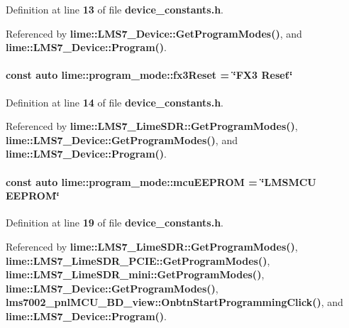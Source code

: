 Definition at line {\bf 13} of file {\bf device\+\_\+constants.\+h}.



Referenced by {\bf lime\+::\+L\+M\+S7\+\_\+\+Device\+::\+Get\+Program\+Modes()}, and {\bf lime\+::\+L\+M\+S7\+\_\+\+Device\+::\+Program()}.

\paragraph[{fx3\+Reset}]{\setlength{\rightskip}{0pt plus 5cm}const auto lime\+::program\+\_\+mode\+::fx3\+Reset = \char`\"{}F\+X3 Reset\char`\"{}}\label{namespacelime_1_1program__mode_aa9c2fd4171461f54f3f0b0738dd0b505}


Definition at line {\bf 14} of file {\bf device\+\_\+constants.\+h}.



Referenced by {\bf lime\+::\+L\+M\+S7\+\_\+\+Lime\+S\+D\+R\+::\+Get\+Program\+Modes()}, {\bf lime\+::\+L\+M\+S7\+\_\+\+Device\+::\+Get\+Program\+Modes()}, and {\bf lime\+::\+L\+M\+S7\+\_\+\+Device\+::\+Program()}.

\paragraph[{mcu\+E\+E\+P\+R\+OM}]{\setlength{\rightskip}{0pt plus 5cm}const auto lime\+::program\+\_\+mode\+::mcu\+E\+E\+P\+R\+OM = \char`\"{}L\+M\+S\+M\+CU E\+E\+P\+R\+OM\char`\"{}}\label{namespacelime_1_1program__mode_aab729fa794be2551839f991ee6777fbe}


Definition at line {\bf 19} of file {\bf device\+\_\+constants.\+h}.



Referenced by {\bf lime\+::\+L\+M\+S7\+\_\+\+Lime\+S\+D\+R\+::\+Get\+Program\+Modes()}, {\bf lime\+::\+L\+M\+S7\+\_\+\+Lime\+S\+D\+R\+\_\+\+P\+C\+I\+E\+::\+Get\+Program\+Modes()}, {\bf lime\+::\+L\+M\+S7\+\_\+\+Lime\+S\+D\+R\+\_\+mini\+::\+Get\+Program\+Modes()}, {\bf lime\+::\+L\+M\+S7\+\_\+\+Device\+::\+Get\+Program\+Modes()}, {\bf lms7002\+\_\+pnl\+M\+C\+U\+\_\+\+B\+D\+\_\+view\+::\+Onbtn\+Start\+Programming\+Click()}, and {\bf lime\+::\+L\+M\+S7\+\_\+\+Device\+::\+Program()}.

